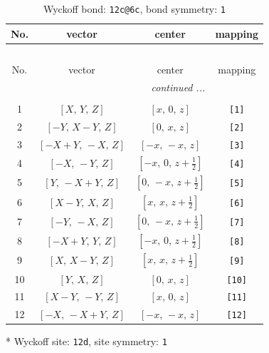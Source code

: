 \documentclass[fleqn,8pt]{jsarticle}
\begin{document}
\begin{longtable}{cccc}
\caption{Wyckoff bond: {\tt 12c@6c}, bond symmetry: {\tt 1}}
 \\
 \hline \hline
No. & vector & center & mapping \\ \hline \endfirsthead

\multicolumn{3}{l}{\tablename\ \thetable{}} \\
 \hline \hline
No. & vector & center & mapping \\ \hline \endhead

 \hline \hline
\multicolumn{3}{r}{\footnotesize\it continued ...} \\ \endfoot

 \hline \hline
\multicolumn{3}{r}{} \\ \endlastfoot

1 & $\left[ X,\, Y,\, Z \right]$ & $\left[ x,\, 0,\, z \right]$ & {\tt [1]} \\ \hline
2 & $\left[ - Y,\, X - Y,\, Z \right]$ & $\left[ 0,\, x,\, z \right]$ & {\tt [2]} \\ \hline
3 & $\left[ - X + Y,\, - X,\, Z \right]$ & $\left[ - x,\, - x,\, z \right]$ & {\tt [3]} \\ \hline
4 & $\left[ - X,\, - Y,\, Z \right]$ & $\left[ - x,\, 0,\, z + \frac{1}{2} \right]$ & {\tt [4]} \\ \hline
5 & $\left[ Y,\, - X + Y,\, Z \right]$ & $\left[ 0,\, - x,\, z + \frac{1}{2} \right]$ & {\tt [5]} \\ \hline
6 & $\left[ X - Y,\, X,\, Z \right]$ & $\left[ x,\, x,\, z + \frac{1}{2} \right]$ & {\tt [6]} \\ \hline
7 & $\left[ - Y,\, - X,\, Z \right]$ & $\left[ 0,\, - x,\, z + \frac{1}{2} \right]$ & {\tt [7]} \\ \hline
8 & $\left[ - X + Y,\, Y,\, Z \right]$ & $\left[ - x,\, 0,\, z + \frac{1}{2} \right]$ & {\tt [8]} \\ \hline
9 & $\left[ X,\, X - Y,\, Z \right]$ & $\left[ x,\, x,\, z + \frac{1}{2} \right]$ & {\tt [9]} \\ \hline
10 & $\left[ Y,\, X,\, Z \right]$ & $\left[ 0,\, x,\, z \right]$ & {\tt [10]} \\ \hline
11 & $\left[ X - Y,\, - Y,\, Z \right]$ & $\left[ x,\, 0,\, z \right]$ & {\tt [11]} \\ \hline
12 & $\left[ - X,\, - X + Y,\, Z \right]$ & $\left[ - x,\, - x,\, z \right]$ & {\tt [12]} \\
\end{longtable}
* Wyckoff site: {\tt 12d}, site symmetry: {\tt 1}
\end{document}
